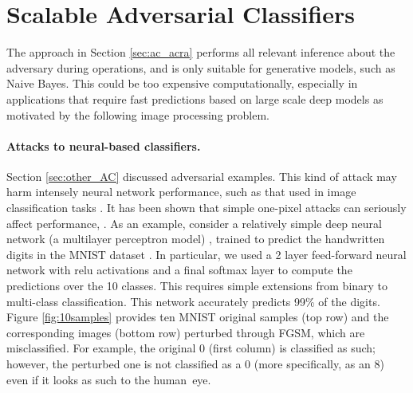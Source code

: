 \section{Scalable Adversarial Classifiers}\label{sec:scalable}
%
The approach in Section \ref{sec:ac_acra} performs all relevant inference about the adversary during operations, and is only suitable for generative models, such as Naive Bayes. This could be too expensive computationally, especially in applications that require fast predictions
based on large scale deep models as motivated by the following image
processing problem.


\paragraph{Attacks to neural-based classifiers.}
Section \ref{sec:other_AC} discussed adversarial examples.  This kind of attack may harm intensely neural
network performance, such as that used in image classification tasks \parencite{Szegedy14intriguingproperties}. It has been shown that simple one-pixel attacks can seriously affect performance, \parencite{su2019one}.
As an example, consider 
a relatively simple deep neural network (a multilayer perceptron model) \parencite{10.5555/3086952}, trained to predict the handwritten digits in the MNIST dataset \parencite{MNIST}. In particular, we used a 2 layer feed-forward neural network with relu activations and a final softmax layer to compute the predictions over the 10 classes. This requires simple extensions from binary to multi-class classification. This network accurately predicts 99\% of the digits. Figure \ref{fig:10samples} provides ten MNIST original 
samples (top row) and the corresponding images (bottom row) perturbed through FGSM,
which are misclassified. For example, the original 0 
(first column) is classified
as such; however, the perturbed one
is not classified as a 0 (more specifically, as an 8) even if it looks as such to the human~eye.%


